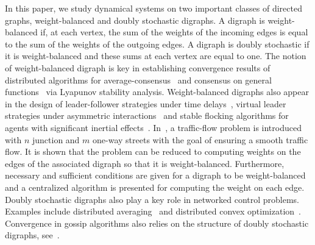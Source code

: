 \documentclass[final]{siamltex}
\begin{document}
In this paper, we study dynamical systems on two important classes of
directed graphs, weight-balanced and doubly stochastic digraphs.
A digraph is weight-balanced if, at each vertex, the sum of the
weights of the incoming edges is equal to the sum of the weights of
the outgoing edges. A digraph is doubly stochastic if it is
weight-balanced and these sums at each vertex are equal to one.  The
notion of weight-balanced digraph is key in establishing convergence
results of distributed algorithms for
average-consensus~\cite{ROS-JAF-RMM:07,ROS-RMM:03c} and consensus on
general functions~\cite{JC:08-auto} via Lyapunov stability analysis.
Weight-balanced digraphs also appear in the design of leader-follower
strategies under time delays~\cite{JH-YH:07}, virtual leader
strategies under asymmetric interactions~\cite{HS-LW-TC:06} and stable
flocking algorithms for agents with significant inertial
effects~\cite{DL-MWS:07}.
In~\cite{LHT:70}, a traffic-flow problem is introduced with $n$
junction and $m$ one-way streets with the goal of ensuring a smooth
traffic flow. It is shown that the problem can be reduced to computing
weights on the edges of the associated digraph so that it is
weight-balanced.
Furthermore, necessary and sufficient conditions are given for a
digraph to be weight-balanced and a centralized algorithm is presented
for computing the weight on each edge.
Doubly stochastic digraphs also play a key role in networked control
problems. Examples include distributed
averaging~\cite{FB-JC-SM:08cor,ROS-RMM:03c,WR-RWB:08,LX-SB:04} and
distributed convex
optimization~\cite{BJ-MR-MJ:09,AN-AO:09,MZ-SM:09}. Convergence in
gossip algorithms also relies on the structure of doubly stochastic
digraphs, see~\cite{SB-AG-BP-DS:06,JL-ASM-BDOA-CY:09}.
\end{document}
